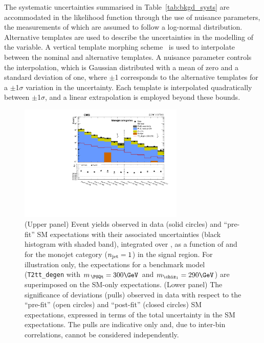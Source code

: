 The systematic uncertainties summarised in Table~\ref{tab:bkgd_systs}
are accommodated in the likelihood function through the use of
nuisance parameters, the measurements of which are assumed to follow a
log-normal distribution. Alternative templates are used to describe
the uncertainties in the modelling of the \HTmiss variable. A vertical
template morphing scheme~\cite{Prosper:2011zz} is used to interpolate
between the nominal and alternative \HTmiss templates. A nuisance
parameter controls the interpolation, which is Gaussian distributed
with a mean of zero and a standard deviation of one, where $\pm$1
corresponds to the alternative templates for a $\pm$1$\sigma$
variation in the uncertainty. Each template is interpolated
quadratically between $\pm$1$\sigma$, and a linear extrapolation is
employed beyond these bounds.

\begin{figure}[!t]
  \begin{center}
    \includegraphics[width=0.7\textwidth]{figures/result/v2/summaryPlot_Monojet_prefit_overlay_fit_b}
    \caption{(Upper panel) Event yields observed in data (solid circles)
      and ``pre-fit'' SM expectations with their associated
      uncertainties (black histogram with shaded band), integrated
      over \HTmiss, as a function of \nb and \scalht for the monojet
      category ($n_{\text{jet}} = 1$) in the signal region. For illustration
      only, the expectations for a benchmark model
      (\texttt{T2tt\_degen} with $m_{\,\PSQt} = 300\GeV$ and
      $m_{\chiz_1} = 290\GeV$) are superimposed on the SM-only
      expectations. (Lower panel) The significance of deviations
      (pulls) observed in data with respect to the ``pre-fit'' (open
      circles) and ``post-fit'' (closed circles) SM expectations,
      expressed in terms of the total uncertainty in the SM
      expectations. The pulls are indicative only and, due to
      inter-bin correlations, cannot be considered independently.}  
    \label{fig:mono}
  \end{center}
\end{figure}

